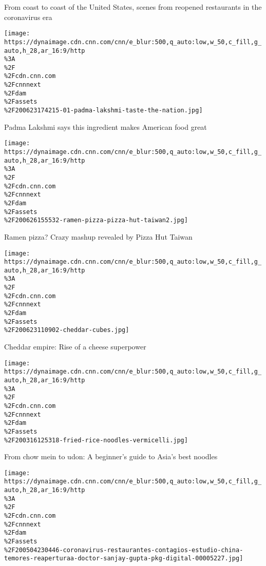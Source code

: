 \href{/travel/article/outdoor-dining-united-states-covid-19/index.html}{}

From coast to coast of the United States, scenes from reopened
restaurants in the coronavirus era

\href{/travel/article/padma-lakshmi-taste-the-nation-interview/index.html}{}

\texttt{[image: https://dynaimage.cdn.cnn.com/cnn/e\_blur:500,q\_auto:low,w\_50,c\_fill,g\_auto,h\_28,ar\_16:9/http\\\%3A\\\%2F\\\%2Fcdn.cnn.com\\\%2Fcnnnext\\\%2Fdam\\\%2Fassets\\\%2F200623174215-01-padma-lakshmi-taste-the-nation.jpg]}

\href{/travel/article/padma-lakshmi-taste-the-nation-interview/index.html}{}

Padma Lakshmi says this ingredient makes American food great

\href{/travel/article/pizza-hut-ramen-pizza/index.html}{}

\texttt{[image: https://dynaimage.cdn.cnn.com/cnn/e\_blur:500,q\_auto:low,w\_50,c\_fill,g\_auto,h\_28,ar\_16:9/http\\\%3A\\\%2F\\\%2Fcdn.cnn.com\\\%2Fcnnnext\\\%2Fdam\\\%2Fassets\\\%2F200626155532-ramen-pizza-pizza-hut-taiwan2.jpg]}

\href{/travel/article/pizza-hut-ramen-pizza/index.html}{}

Ramen pizza? Crazy mashup revealed by Pizza Hut Taiwan

\href{/travel/article/cheddar-cheese-history/index.html}{}

\texttt{[image: https://dynaimage.cdn.cnn.com/cnn/e\_blur:500,q\_auto:low,w\_50,c\_fill,g\_auto,h\_28,ar\_16:9/http\\\%3A\\\%2F\\\%2Fcdn.cnn.com\\\%2Fcnnnext\\\%2Fdam\\\%2Fassets\\\%2F200623110902-cheddar-cubes.jpg]}

\href{/travel/article/cheddar-cheese-history/index.html}{}

Cheddar empire: Rise of a cheese superpower

\href{/travel/article/asian-noodles-guide/index.html}{}

\texttt{[image: https://dynaimage.cdn.cnn.com/cnn/e\_blur:500,q\_auto:low,w\_50,c\_fill,g\_auto,h\_28,ar\_16:9/http\\\%3A\\\%2F\\\%2Fcdn.cnn.com\\\%2Fcnnnext\\\%2Fdam\\\%2Fassets\\\%2F200316125318-fried-rice-noodles-vermicelli.jpg]}

\href{/travel/article/asian-noodles-guide/index.html}{}

From chow mein to udon: A beginner's guide to Asia's best noodles

\href{/travel/article/coronavirus-safety-restaurants-wellness/index.html}{}

\texttt{[image: https://dynaimage.cdn.cnn.com/cnn/e\_blur:500,q\_auto:low,w\_50,c\_fill,g\_auto,h\_28,ar\_16:9/http\\\%3A\\\%2F\\\%2Fcdn.cnn.com\\\%2Fcnnnext\\\%2Fdam\\\%2Fassets\\\%2F200504230446-coronavirus-restaurantes-contagios-estudio-china-temores-reaperturaa-doctor-sanjay-gupta-pkg-digital-00005227.jpg]}

